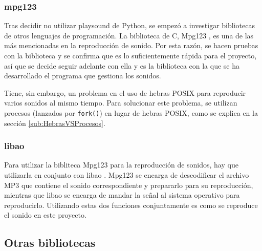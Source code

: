 
            \subsubsection{mpg123} %
            \label{ssub:Mpg123}

                Tras decidir no utilizar playsound de Python, se empezó a investigar bibliotecas de otros lenguajes de
                programación. La biblioteca de C, Mpg123 \cite{mpg123}, es una de las más mencionadas en la reproducción
                de sonido. Por esta razón, se hacen pruebas con la biblioteca y se confirma que es lo suficientemente
                rápida para el proyecto, así que se decide seguir adelante con ella y es la biblioteca con la que se ha
                desarrollado el programa que gestiona los sonidos.

                Tiene, sin embargo, un problema en el uso de hebras POSIX para reproducir varios sonidos al mismo
                tiempo. Para solucionar este problema, se utilizan procesos (lanzados por \texttt{fork()}) en lugar de
                hebras POSIX, como se explica en la sección \ref{sub:HebrasVSProcesos}.


            \subsubsection{libao} %
            \label{ssub:Libao}

                Para utilizar la bibliteca Mpg123 para la reproducción de sonidos, hay que utilizarla en conjunto con
                libao \cite{libao}. Mpg123 se encarga de descodificar el archivo MP3 que contiene el sonido
                correspondiente y prepararlo para su reproducción, mientras que libao se encarga de mandar la señal al
                sistema operativo para reproducirlo. Utilizando estas dos funciones conjuntamente es como se reproduce
                el sonido en este proyecto.



        \subsection{Otras bibliotecas} %
        \label{sub:OtrasLibrerias}

